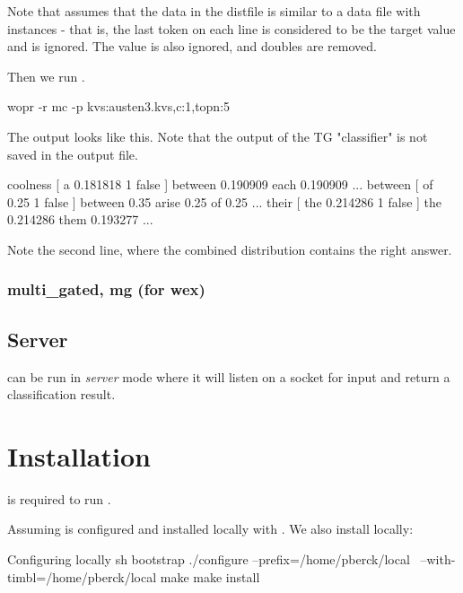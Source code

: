 \documentclass[a4paper,10pt,twoside]{report}
\begin{document}
Note that \wopr{} assumes that the data in the distfile is similar to a
data file with instances - that is, the last token on each line is
considered to be the target value and is ignored. The \cmp{\_} value is also
ignored, and doubles are removed.

Then we run \wopr{}.

\begin{bash}{}
wopr -r mc -p kvs:austen3.kvs,c:1,topn:5
\end{bash}

The output looks like this. Note that the output of the TG
"classifier" is not saved in the output file.

\begin{wout}{}
coolness [ a 0.181818 1 false ] { between 0.190909 each 0.190909 ... }
between [ of 0.25 1 false ] { between 0.35 arise 0.25 of 0.25 ... }
their [ the 0.214286 1 false ] { the 0.214286 them 0.193277 ... }
\end{wout}

Note the second line, where the combined distribution contains the
right answer.

\subsection{multi\_gated, mg (for wex)} %

\section{Server}

\Wopr{} can be run in \emph{server} mode where it will listen on a socket
for input and return a classification result.



\chapter{Installation}

\Timbl{} is required to run \wopr{}.

Assuming \Timbl{} is configured and installed locally with
. We also install \wopr{} locally:

\begin{bash}{Configuring \wopr{} locally}
sh bootstrap
./configure --prefix=/home/pberck/local \
            --with-timbl=/home/pberck/local
make
make install
\end{bash}
\end{document}
